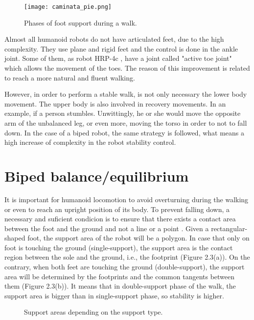 \begin{figure}[!hbt]
\centering
\texttt{[image: caminata\_pie.png]}
\caption{Phases of foot support during a walk.}
\label{fig:caminata_pie}
\end{figure}

Almost all humanoid robots do not have articulated feet, due to the high complexity. They use plane and rigid feet and the control is done in the ankle joint. Some of them, as robot HRP-4c \cite{Kan2011}, have a joint called "active toe joint" which allows the movement of the toes. The reason of this improvement is related to reach a more natural and fluent walking.

However, in order to perform a stable walk, is not only necessary the lower body movement. The upper body is also involved in recovery movements. In an example, if a person stumbles. Unwittingly, he or she would move the opposite arm of the unbalanced leg, or even more, moving the torso in order to not to fall down. In the case of a biped robot, the same strategy is followed, what means a high increase of complexity in the robot stability control.

\section{Biped balance/equilibrium}
It is important for humanoid locomotion to avoid overturning during the walking or even to reach an upright position of its body. To prevent falling down, a necessary and suficient condicion is to ensure that there exists a contact area between the foot and the ground and not a line or a point \cite{Vuk2007}. Given a rectangular-shaped foot, the support area of the robot will be a polygon. In case that only on foot is touching the ground (single-support), the support area is the contact region between the sole and the ground, i.e., the footprint (Figure 2.3(a)). On the contrary, when both feet are touching the ground (double-support), the support area will be determined by the footprints and the common tangents between them (Figure 2.3(b)). It means that in double-support phase of the walk, the support area is bigger than in single-support phase, so stability is higher.

\begin{figure}[!hbt]
\centering
{}
\hspace{10mm}
\caption{Support areas depending on the support type.}
\label{fig:apoyo}
\end{figure}


